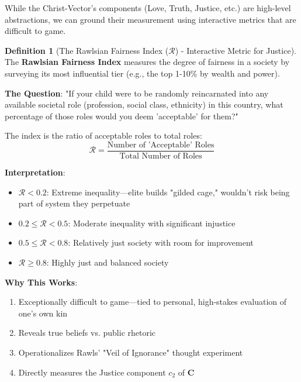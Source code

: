 \documentclass[11pt,a4paper]{article}
\theoremstyle{definition}
\newtheorem{definition}{Definition}[section]
\theoremstyle{remark}
\begin{document}
While the Christ-Vector's components (Love, Truth, Justice, etc.) are high-level abstractions, we can ground their measurement using interactive metrics that are difficult to game.

\begin{definition}[The Rawlsian Fairness Index (\(\mathcal{R}\)) - Interactive Metric for Justice]
The \textbf{Rawlsian Fairness Index} measures the degree of fairness in a society by surveying its most influential tier (e.g., the top 1-10\% by wealth and power). 

\textbf{The Question}: "If your child were to be randomly reincarnated into any available societal role (profession, social class, ethnicity) in this country, what percentage of those roles would you deem 'acceptable' for them?"

The index is the ratio of acceptable roles to total roles:
\begin{equation}
\mathcal{R} = \frac{\text{Number of 'Acceptable' Roles}}{\text{Total Number of Roles}}
\end{equation}

\textbf{Interpretation}:
\begin{itemize}
    \item \(\mathcal{R} < 0.2\): Extreme inequality—elite builds "gilded cage," wouldn't risk being part of system they perpetuate
    \item \(0.2 \leq \mathcal{R} < 0.5\): Moderate inequality with significant injustice
    \item \(0.5 \leq \mathcal{R} < 0.8\): Relatively just society with room for improvement
    \item \(\mathcal{R} \geq 0.8\): Highly just and balanced society
\end{itemize}

\textbf{Why This Works}: 
\begin{enumerate}
    \item Exceptionally difficult to game—tied to personal, high-stakes evaluation of one's own kin
    \item Reveals true beliefs vs. public rhetoric
    \item Operationalizes Rawls' "Veil of Ignorance" thought experiment
    \item Directly measures the Justice component \(c_2\) of \(\mathbf{C}\)
\end{enumerate}
\end{definition}
\end{document}
